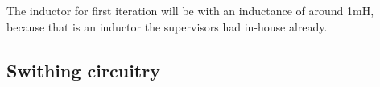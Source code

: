 The inductor for first iteration  will be with an inductance of around 1mH,  because that is an inductor the supervisors had in-house already.

\subsection{Swithing circuitry}










